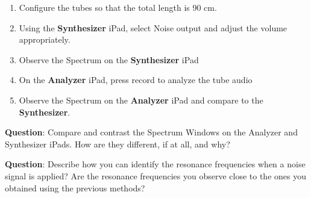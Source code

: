 \documentclass[12pt]{article}
\begin{document}
\begin{enumerate}
\item Configure the tubes so that the total length is 90 cm.
\item Using the \textbf{Synthesizer} iPad, select Noise output and adjust the volume appropriately.
\item Observe the Spectrum on the \textbf{Synthesizer} iPad
\item On the \textbf{Analyzer} iPad, press record to analyze the tube audio
\item Observe the Spectrum on the \textbf{Analyzer} iPad and compare to the \textbf{Synthesizer}.
\end{enumerate}

\textbf{Question}: Compare and contrast the Spectrum Windows on the Analyzer and Synthesizer iPads. How are they different, if at all, and why?
\vspace{1.2in}


\textbf{Question}: Describe how you can identify the resonance frequencies when a noise signal is applied? Are the resonance frequencies you observe close to the ones you obtained using the previous methods?
\vspace{.6in}
\end{document}
